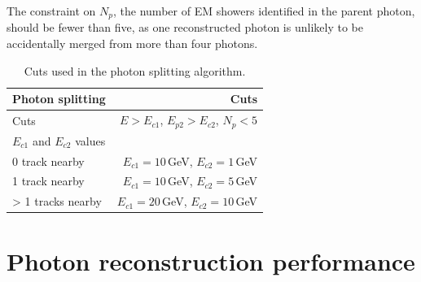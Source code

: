 
The constraint on $N_{p}$, the number of EM showers identified in the parent photon, should be fewer than five, as one reconstructed photon is unlikely to be accidentally merged from more than four photons.


\begin{table}[htbp]
\centering
\smallskip
\begin{tabular}{l r }
\hline
\hline
Photon splitting&  Cuts\\
\hline
\multicolumn{1}{L{0.3\textwidth}}{Cuts} & \multicolumn{1}{R{0.6\textwidth}}{$E > E_{c1}$, $E_{p2} > E_{c2}$, $N_{p} < 5$} \\
\hline
$E_{c1}$ and $E_{c2}$ values &  \\
\hline
\multicolumn{1}{L{0.3\textwidth}}{0 track nearby} & \multicolumn{1}{R{0.6\textwidth}}{$E_{c1} = 10$\,GeV, $E_{c2} = 1$\,GeV} \\
\multicolumn{1}{L{0.3\textwidth}}{1 track nearby} & \multicolumn{1}{R{0.6\textwidth}}{$E_{c1} = 10$\,GeV, $E_{c2} = 5$\,GeV} \\
\multicolumn{1}{L{0.3\textwidth}}{> 1 tracks nearby} & \multicolumn{1}{R{0.6\textwidth}}{$E_{c1} = 20$\,GeV, $E_{c2} = 10$\,GeV} \\
\hline
\hline
\end{tabular}

\caption[Cuts for splitting photons.]%
{Cuts used in the photon splitting algorithm. }
\label{tab:photonPhotonSplitting}
\end{table}


\section{Photon reconstruction performance}


